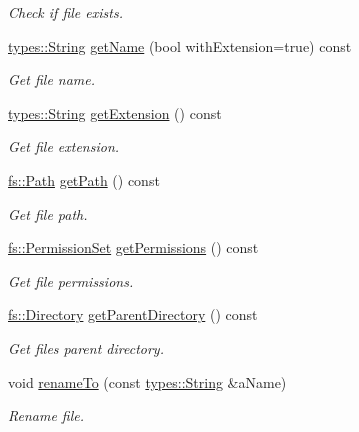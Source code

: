 \begin{DoxyCompactItemize}
\begin{DoxyCompactList}\small\item\em Check if file exists. \end{DoxyCompactList}\item 
\hyperlink{classlibrary_1_1core_1_1types_1_1String}{types\+::\+String} \hyperlink{classlibrary_1_1core_1_1fs_1_1File_affd399abd971505b424d7ced3d43c61d}{get\+Name} (bool with\+Extension=true) const
\begin{DoxyCompactList}\small\item\em Get file name. \end{DoxyCompactList}\item 
\hyperlink{classlibrary_1_1core_1_1types_1_1String}{types\+::\+String} \hyperlink{classlibrary_1_1core_1_1fs_1_1File_a157085065abfb37e58a1d5ea44eb96e8}{get\+Extension} () const
\begin{DoxyCompactList}\small\item\em Get file extension. \end{DoxyCompactList}\item 
\hyperlink{classlibrary_1_1core_1_1fs_1_1Path}{fs\+::\+Path} \hyperlink{classlibrary_1_1core_1_1fs_1_1File_a70b1380ff844adf37a481bbdb46d11a0}{get\+Path} () const
\begin{DoxyCompactList}\small\item\em Get file path. \end{DoxyCompactList}\item 
\hyperlink{classlibrary_1_1core_1_1fs_1_1PermissionSet}{fs\+::\+Permission\+Set} \hyperlink{classlibrary_1_1core_1_1fs_1_1File_a0addf18f7510955e48fdef2416b98423}{get\+Permissions} () const
\begin{DoxyCompactList}\small\item\em Get file permissions. \end{DoxyCompactList}\item 
\hyperlink{classlibrary_1_1core_1_1fs_1_1Directory}{fs\+::\+Directory} \hyperlink{classlibrary_1_1core_1_1fs_1_1File_a8eb74097f9bdc9d3c626fe4924bf405e}{get\+Parent\+Directory} () const
\begin{DoxyCompactList}\small\item\em Get file\textquotesingle{}s parent directory. \end{DoxyCompactList}\item 
void \hyperlink{classlibrary_1_1core_1_1fs_1_1File_ad2a6b7b5dc95d7a00c9e6dbc92eff4d9}{rename\+To} (const \hyperlink{classlibrary_1_1core_1_1types_1_1String}{types\+::\+String} \&a\+Name)
\begin{DoxyCompactList}\small\item\em Rename file. \end{DoxyCompactList}\item 

\end{DoxyCompactItemize}
